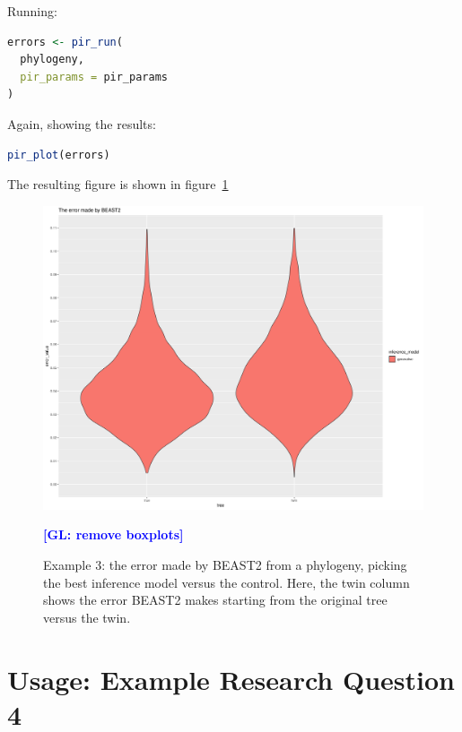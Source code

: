\documentclass{article}
\newcommand{\giovanni}[1]{\textcolor{blue}{\textbf{[GL: #1]}}}
\begin{document}
Running:

\begin{lstlisting}[language=R, floatplacement=ht, frame=single]
errors <- pir_run(
  phylogeny,
  pir_params = pir_params
)
\end{lstlisting}

Again, showing the results:

\begin{lstlisting}[language=R, floatplacement=ht, frame=single]
pir_plot(errors)
\end{lstlisting}

The resulting figure is shown in figure~\ref{fig:example_3}

\begin{figure}[ht]
  \includegraphics[width=\textwidth]{example_3_errors.png}
  \caption{
    Example 3: the error made by BEAST2 from a phylogeny, picking the best inference model versus the control.
    Here, the twin column shows the error BEAST2 makes starting from the original tree versus the twin. 
  }
  \label{fig:example_3}
  \giovanni{remove boxplots}
\end{figure}

\section{Usage: Example Research Question 4}
\end{document}
